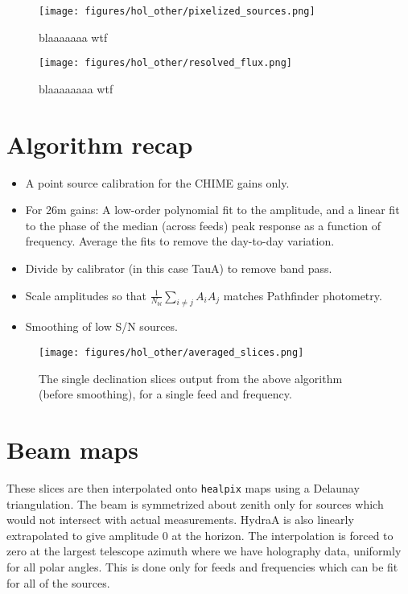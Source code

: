 \begin{figure}[h!]
\texttt{[image: figures/hol\_other/pixelized\_sources.png]}
\caption{blaaaaaaa wtf}
\label{pixelized_sources}
\end{figure} 

\begin{figure}[h!]
\texttt{[image: figures/hol\_other/resolved\_flux.png]}
\caption{blaaaaaaaa wtf}
\label{resolved_flux}
\end{figure} 


\section{Algorithm recap}

\begin{itemize}
\item A point source calibration for the CHIME gains only.
\item For 26m gains: A low-order polynomial fit to the amplitude, and a linear fit to the phase of the median (across feeds) peak response as a function of frequency. Average the fits to remove the day-to-day variation.
\item Divide by calibrator (in this case TauA) to remove band pass.
\item Scale amplitudes so that $\frac{1}{N_{bl}}\sum_{i\neq j} A_i A_j$ matches Pathfinder photometry.
\item Smoothing of low S/N sources.
\end{itemize}

\begin{figure}[h!]
\begin{center}
\texttt{[image: figures/hol\_other/averaged\_slices.png]}
\caption{The single declination slices output from the above algorithm (before smoothing), for a single feed and frequency.}
\label{example}
\end{center}
\end{figure}

\newpage
\section{Beam maps}

These slices are then interpolated onto \texttt{healpix} maps using a Delaunay triangulation. The beam is symmetrized about zenith only for sources which would not intersect with actual measurements. HydraA is also linearly extrapolated to give amplitude 0 at the horizon. The interpolation is forced to zero at the largest telescope azimuth where we have holography data, uniformly for all polar angles. This is done only for feeds and frequencies which can be fit for all of the sources. 

